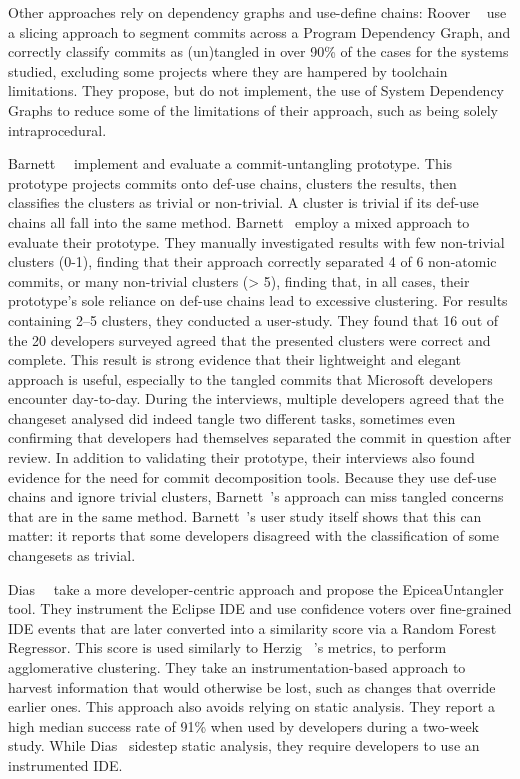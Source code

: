 Other approaches rely on dependency graphs and use-define chains: Roover
\etal~\cite{Roover2017} use a slicing approach to segment commits across a
Program Dependency Graph, and correctly classify commits as (un)tangled in over
90\% of the cases for the systems studied, excluding some projects where they
are hampered by toolchain limitations. They propose, but do not implement, the
use of System Dependency Graphs to reduce some of the limitations of their
approach, such as being solely intraprocedural.

Barnett~\etal~\cite{Barnett2015} implement and evaluate a commit-untangling
prototype. This prototype projects commits onto def-use chains, clusters the
results, then classifies the clusters as trivial or non-trivial. A cluster is
trivial if its def-use chains all fall into the same method. Barnett~\etal
employ a mixed approach to evaluate their prototype. They manually investigated
results with few non-trivial clusters (0-1), finding that their approach
correctly separated 4 of 6 non-atomic commits,  or many non-trivial clusters (>
5), finding that, in all cases, their prototype's sole reliance on def-use
chains lead to excessive clustering. For results containing 2--5 clusters, they
conducted a user-study. They found that 16 out of the 20 developers surveyed
agreed that the presented clusters were correct and complete. This result is
strong evidence that their lightweight and elegant approach is useful,
especially to the tangled commits that Microsoft developers encounter
day-to-day. During the interviews, multiple developers agreed that the changeset
analysed did indeed tangle two different tasks, sometimes even confirming that
developers had themselves separated the commit in question after review. In
addition to validating their prototype, their interviews also found evidence for
the need for commit decomposition tools. Because they use def-use chains and
ignore trivial clusters, Barnett~\etal's approach can miss tangled concerns that
are in the same method. Barnett~\etal's user study itself shows that this can
matter: it reports that some developers disagreed with the classification of
some changesets as trivial.

Dias~\etal~\cite{Dias2015} take a more developer-centric approach and propose
the EpiceaUntangler tool. They instrument the Eclipse IDE and use confidence
voters over fine-grained IDE events that are later converted into a similarity
score via a Random Forest Regressor. This score is used similarly to Herzig
\etal~\cite{Herzig2016}'s metrics, \ie to perform agglomerative clustering. They
take an instrumentation-based approach to harvest information that would
otherwise be lost, such as changes that override earlier ones. This approach
also avoids relying on static analysis. They report a high median success rate
of 91\% when used by developers during a two-week study. While Dias~\etal
sidestep static analysis, they require developers to use an instrumented IDE.

